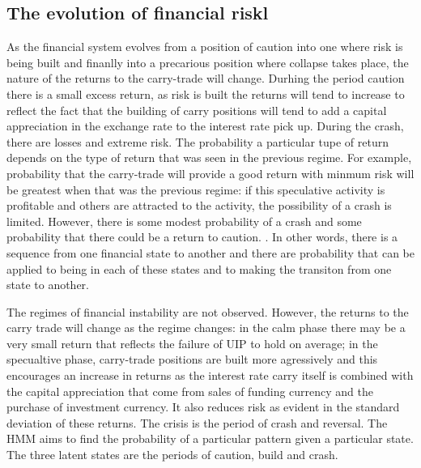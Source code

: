 \documentclass[12pt, a4paper, oneside]{article} %
\begin{document}
\subsection{The evolution of financial riskl}
As the financial system evolves from a position of caution into one where risk is being built and finanlly into a precarious position where collapse takes place, the nature of the returns to the carry-trade will change. Durhing the period caution there is a small excess return, as risk is built the returns will tend to increase to reflect the fact that the building of carry positions will tend to add a capital appreciation in the exchange rate to the interest rate pick up. During the crash, there are losses and extreme risk.   The probability a particular tupe of return depends on the type of return that was seen in the previous regime.   For example, probability that the carry-trade will provide a good return with minmum risk will be greatest when that was the previous regime:  if this speculative activity is profitable and others are attracted to the activity, the possibility of a crash is limited.  However, there is some modest probability of a crash and some probability that there could be a return to caution. .  In other words, there is a sequence from one financial state to another and there are probability that can be applied to being in each of these states and to making the transiton from one state to another.


The regimes of financial instability are not observed.  However, the returns to the carry trade will change as the regime changes:  in the calm phase there may be a very small return that reflects the failure of UIP to hold on average; in the specualtive phase, carry-trade positions are built more agressively and this encourages an increase in returns as the interest rate carry itself is combined with the capital appreciation that come from sales of funding currency and the purchase of investment currency.  It also reduces risk as evident in the standard deviation of these returns. The crisis is the period of crash and reversal.  The HMM aims to find the probability of a particular pattern given a particular state. The three latent states are the periods of caution, build and crash.   
\end{document}
